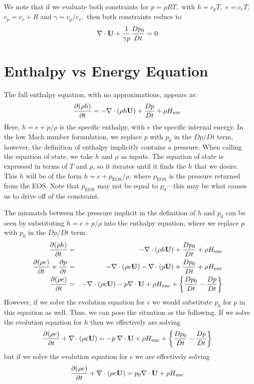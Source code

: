We note that if we evaluate both constraints for $p = \rho R T,$ with $h = c_p T,$ $e = c_v T,$
$c_p = c_v + R$ and $\gamma = c_p / c_v,$ then both constraints reduce to 
\begin{equation}
\nabla \cdot {\bf U} + \frac{1}{\gamma p} \frac{D p_0}{D t} = 0
\end{equation}

\section{Enthalpy vs Energy Equation}

The full enthalpy equation, with no approximations, appears as:
\begin{equation}
\frac{\partial(\rho h)}{\partial t} = -\nabla\cdot(\rho h{\bf U}) + 
  \frac{Dp}{Dt} + \rho{H_{\rm nuc}} \label{eq:enthalpy}
\end{equation}
Here, $h = e + p/\rho$ is the specific enthalpy, with $e$ the specific
internal energy.  In the low Mach number formulation, we replace $p$
with $p_0$ in the $Dp/Dt$ term, however, the definition of enthalpy
implicitly contains a pressure.  When calling the equation of state,
we take $h$ and $\rho$ as inputs.  The equation of state is expressed
in terms of $T$ and $\rho$, so it iterates until it finds the $h$ that
we desire.  This $h$ will be of the form $h = e + p_\mathrm{EOS}/\rho$,
where $p_\mathrm{EOS}$ is the pressure returned from the EOS.  Note that
$p_\mathrm{EOS}$ may not be equal to $p_0$---this may be what
causes us to drive off of the constraint. 

The mismatch between the pressure implicit in the definition of $h$
and $p_0$ can be seen by substituting $h = e + p/\rho$ into the
enthalpy equation, where we replace $p$ with $p_0$ in the $Dp/Dt$ term:
\begin{eqnarray}
\frac{\partial(\rho h)}{\partial t} &=& -\nabla\cdot(\rho h\Ub) + 
  \frac{Dp_0}{Dt} + \rho\Hnuc \nonumber \\
%
\frac{\partial(\rho e)}{\partial t} + \frac{\partial p}{\partial t} &=&
 -\nabla\cdot(\rho e\Ub) -\nabla\cdot(p\Ub) + \frac{Dp_0}{Dt} + \rho\Hnuc \nonumber \\
%
\frac{\partial(\rho e)}{\partial t} &=&
 -\nabla\cdot(\rho e\Ub) - p\nabla\cdot\Ub + \rho\Hnuc + 
  \left \{ \frac{Dp_0}{Dt} - \frac{Dp}{Dt} \right \} \nonumber 
\end{eqnarray}
However, if we solve the evolution equation for $e$ we would substitute 
$p_0$ for $p$ in this equation as well.  Thus, we can pose the situation as the following.  
If we solve the evolution equation for $h$ then we effectively are solving
\begin{equation}
\frac{\partial(\rho e)}{\partial t} +
  \nabla\cdot(\rho e{\bf U}) = -p \; \nabla\cdot{\bf U} + \rho{H_{\rm nuc}} + 
  \left \{ \frac{Dp_0}{Dt} - \frac{Dp}{Dt} \right \} \nonumber 
\end{equation}
but if we solve the evolution equation for $e$ we are effectively solving
\begin{equation}
\frac{\partial(\rho e)}{\partial t} +
  \nabla\cdot(\rho e{\bf U}) = p_0 \nabla\cdot{\bf U} + \rho{H_{\rm nuc}} \nonumber 
\end{equation}

